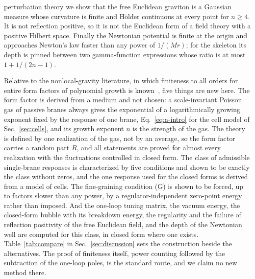 \documentclass[aps,prd,10pt,twocolumn,superscriptaddress,nofootinbib,floatfix,longbibliography]{revtex4-2}
\begin{document}
perturbation theory we show that the free Euclidean graviton is a Gaussian measure whose curvature is finite and H\"older continuous at every point for $n\ge4$. It is not reflection positive, so it is not the Euclidean form of a field theory with a positive Hilbert space. Finally the Newtonian potential is finite at the origin and approaches Newton's law faster than any power of $1/(Mr)$; for the skeleton its depth is pinned between two gamma-function expressions whose ratio is at most $1+1/(2n-1)$.

Relative to the nonlocal-gravity literature, in which finiteness to all orders for entire form factors of polynomial growth is known~\cite{Tomboulis1997,Modesto2012,ModestoRachwal2014}, five things are new here. The form factor is derived from a medium and not chosen: a scale-invariant Poisson gas of passive branes always gives the exponential of a logarithmically growing exponent fixed by the response of one brane, Eq.~\eqref{eq:a-intro} for the cell model of Sec.~\ref{sec:cells}, and its growth exponent $n$ is the strength of the gas. The theory is defined by one realization of the gas, not by an average, so the form factor carries a random part $R$, and all statements are proved for almost every realization with the fluctuations controlled in closed form. The class of admissible single-brane responses is characterized by five conditions and shown to be exactly the class without zeros, and the one response used for the closed forms is derived from a model of cells. The fine-graining condition (G) is shown to be forced, up to factors slower than any power, by a regulator-independent zero-point energy rather than imposed. And the one-loop tuning matrix, the vacuum energy, the closed-form bubble with its breakdown energy, the regularity and the failure of reflection positivity of the free Euclidean field, and the depth of the Newtonian well are computed for this class, in closed form where one exists. Table~\ref{tab:compare} in Sec.~\ref{sec:discussion} sets the construction beside the alternatives. The proof of finiteness itself, power counting followed by the subtraction of the one-loop poles, is the standard route, and we claim no new method there.
\end{document}
